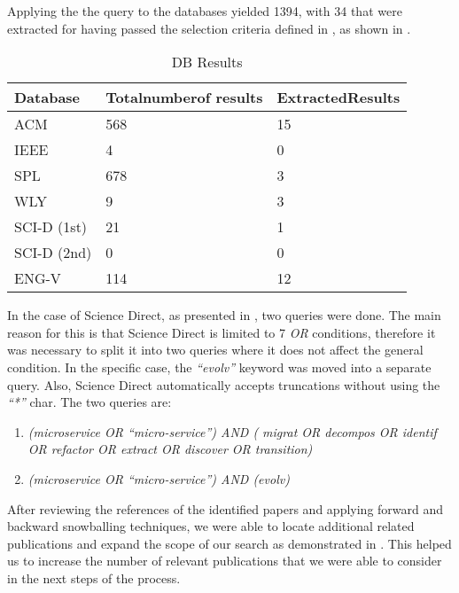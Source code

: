 Applying the the query to the databases yielded 1394, with 34 that were
extracted for having passed the selection criteria defined in
, as shown in .

\begin{table}[!htb] \caption{DB Results} \label{tab:other-db-search}
  \begin{center}
    \begin{tabular}[c]{p{5em}|p{5em}|p{5em}}
      \textbf{Database} &
      \textbf{Total\newline number\newline of results} &
      \textbf{Extracted\newline Results} \\
      \hline {ACM} & {568} & {15} \\
      \hline {IEEE} & {4} & {0} \\
      \hline {SPL} & {678} & {3} \\
      \hline {WLY} & {9} & {3} \\
      \hline {SCI-D (1st)} & {21} & {1} \\
      \hline {SCI-D (2nd)} & {0} & {0} \\
      \hline {ENG-V} & {114} & {12} \\
    \end{tabular}
  \end{center}
\end{table}

In the case of Science Direct, as presented in ,
two queries were done. The main reason for this is that Science Direct is
limited to 7 \textit{OR} conditions, therefore it was necessary to split it
into two queries where it does not affect the general condition. In the
specific case, the \textit{``evolv''} keyword was moved into a separate query.
Also, Science Direct automatically accepts truncations without using the
\textit{``*''} char. The two queries are:

\begin{enumerate}
  \item \emph{(microservice OR ``micro-service'') AND ( migrat OR decompos OR
    identif OR refactor OR extract OR discover OR transition)}
  \item \emph{(microservice OR ``micro-service'') AND (evolv)}
\end{enumerate}

After reviewing the references of the identified papers and applying forward
and backward snowballing techniques, we were able to locate additional related
publications and expand the scope of our search as demonstrated in
. This helped us to increase the number of relevant
publications that we were able to consider in the next steps of the process.

